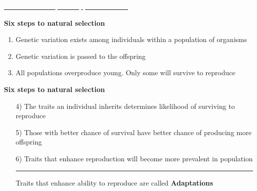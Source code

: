 \documentclass[t]{beamer}
\begin{document}
{
\begin{frame}[t]

\vfilll

\tiny \href{https://pixnio.com/people/crowd/silhouette-audience-crowd-concert-music-people-music-stage-performance}{\textcolor{white}{Author unknown, Pixnio, public domain.}}
\end{frame}
}

%


%
\begin{frame}[t]{\LARGE \bfseries \hfill Six steps to natural selection \hfill}

\Large
\begin{enumerate}
\item Genetic variation exists among individuals within a population of organisms

\bigskip

\item Genetic variation is passed to the offspring

\bigskip

\item All populations overproduce young. Only some will survive to reproduce

\end{enumerate}
\end{frame}
%

\begin{frame}[t]{\LARGE \bfseries \hfill Six steps to natural selection \hfill}

\Large

\begin{enumerate}
\item[\color{black}4)] The traits an individual inherits determines likelihood of surviving to reproduce

\bigskip

\item[\color{black}5)] Those with better chance of survival have better chance of producing more offspring

\bigskip

\item[\color{black}6)] Traits that enhance reproduction will become more prevalent in population

\rule{\linewidth}{0.4pt}

\centering Traits that enhance ability to reproduce are called 
\textbf{Adaptations}

\end{enumerate}
\end{frame}
\end{document}
